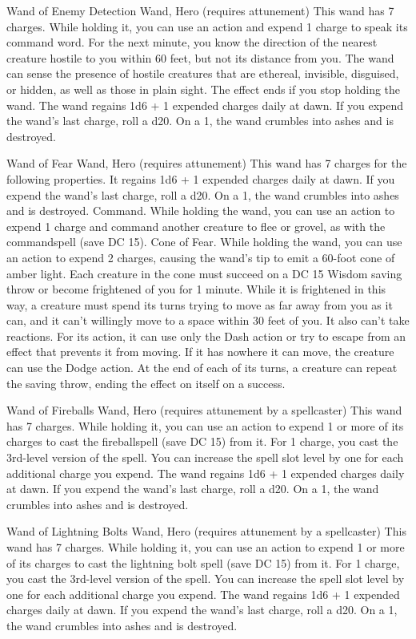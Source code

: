 Wand of Enemy Detection
Wand, Hero (requires attunement)
This wand has 7 charges. While holding it, you can use an action and expend 1 charge to speak its command word. For the next minute, you know the direction of the nearest creature hostile to you within 60 feet,
but not its distance from you. The wand can sense the presence of hostile creatures that are ethereal, invisible, disguised, or hidden, as well as those in plain sight. The effect ends if you stop holding the wand.
The wand regains 1d6 + 1 expended charges daily at dawn. If you expend the wand's last charge, roll a d20. On a 1, the wand crumbles into ashes and is destroyed.

Wand of Fear
Wand, Hero (requires attunement)
This wand has 7 charges for the following properties. It regains 1d6 + 1 expended charges daily at dawn. If you expend the wand's last charge, roll a d20. On a 1, the wand crumbles into ashes and is destroyed.
Command. While holding the wand, you can use an action to expend 1 charge and command another creature to flee or grovel, as with the
commandspell (save DC 15).
Cone of Fear. While holding the wand, you can use an action to expend 2 charges, causing the wand's tip to emit a 60-foot cone of amber light. Each creature in the cone must succeed on a DC 15 Wisdom saving throw or become frightened of you for 1 minute. While it is frightened in this way, a creature must spend its turns trying to move as far away from you as it can, and it can't willingly move to a space within 30 feet of you. It also can't take reactions. For its action, it can use only the Dash action or try to escape from an effect that prevents it from moving. If it has nowhere it can move, the creature can use the Dodge action. At the end of each of its turns, a creature can repeat the saving throw, ending the effect on itself on a success.

Wand of Fireballs
Wand, Hero (requires attunement by a spellcaster)
This wand has 7 charges. While holding it, you can use an action to expend 1 or more of its charges to cast the
fireballspell (save DC 15) from it. For 1 charge, you cast the 3rd-level version of the spell. You can increase the spell slot level by one for each additional charge you expend.
The wand regains 1d6 + 1 expended charges daily at dawn. If you expend the wand's last charge, roll a
d20. On a 1, the wand crumbles into ashes and is destroyed.

Wand of Lightning Bolts
Wand, Hero (requires attunement by a spellcaster) This wand has 7 charges. While holding it, you can use an action to expend 1 or more of its charges to cast the lightning bolt spell (save DC 15) from it. For 1 charge, you cast the 3rd-level version of the spell. You can increase the spell slot level by one for each additional charge you expend.  The wand regains 1d6 + 1 expended charges daily at dawn. If you expend the wand's last charge, roll a d20. On a 1, the wand crumbles into ashes and is destroyed.


